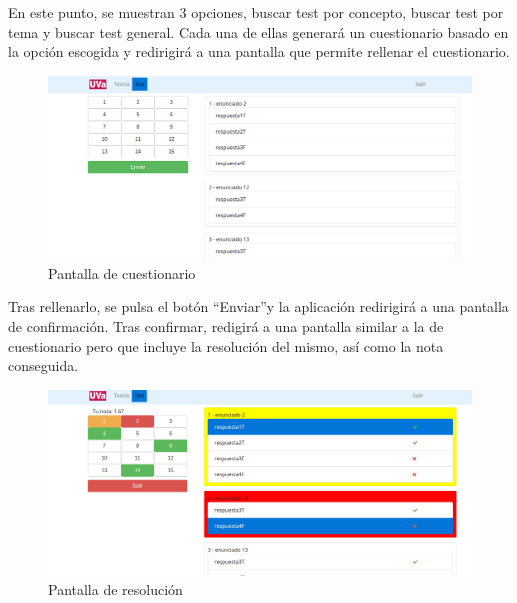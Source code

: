 \documentclass[openright,twoside,10pt]{book}
\begin{document}
    En este punto, se muestran 3 opciones, buscar test por concepto, buscar
    test por tema y buscar test general. Cada una de ellas generará un
    cuestionario basado en la opción escogida y redirigirá a una pantalla
    que permite rellenar el cuestionario.
    
    \begin{figure}[H]
        \begin{center}
            \includegraphics[width=\textwidth]{img/manual/alumno-test5.png}
        \end{center}
        \caption{Pantalla de cuestionario}
    \end{figure}
    
    Tras rellenarlo, se pulsa el botón \enquote{Enviar}y la aplicación
    redirigirá a una pantalla de confirmación. Tras confirmar, redigirá a
    una pantalla similar a la de cuestionario pero que incluye la resolución
    del mismo, así como la nota conseguida.
    
    \begin{figure}[H]
        \begin{center}
            \includegraphics[width=\textwidth]{img/manual/alumno-test6.png}
        \end{center}
        \caption{Pantalla de resolución}
    \end{figure}
    
    \newpage
    
\end{document}
